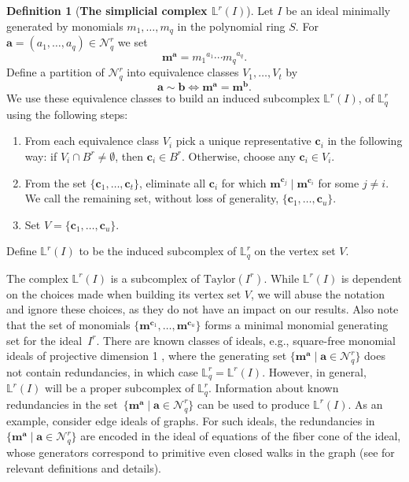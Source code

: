 \documentclass[11pt]{article}
\theoremstyle{definition}
\newtheorem{defi}[theo]{Definition}
\numberwithin{equation}{section}
\newcommand{\Nrq}{\mathcal{N}^r_q}
\newcommand{\Taylor}{\mathrm{Taylor}}
\newcommand{\m}{\mathbf{m}}
\newcommand{\Lrq}{\mathbb{L}^r_q}
\newcommand{\Lr}{\mathbb{L}^r}
\newcommand{\ba}{\mathbf{a}}
\newcommand{\bb}{\mathbf{b}}
\newcommand{\bc}{\mathbf{c}}
\newcommand{\bma}{\mathbf{m}^\ba}
\newcommand{\bmb}{\mathbf{m}^\bb}
\begin{document}
\begin{defi}[{\bf The simplicial complex $\Lr(I)$}]\label{d:LrI}
  Let $I$ be an ideal minimally generated by monomials
  $m_1,\ldots,m_q$ in the polynomial ring $S$. For $\ba = (a_1,
  \ldots, a_q) \in \Nrq$ we set
  $$\bma={m_1}^{a_1} \cdots {m_q}^{a_q}.$$ Define a partition of $\Nrq$
  into equivalence classes $V_1,\ldots,V_t$ by
  $$\ba \sim \bb \iff \bma=\bmb.$$
 We use these equivalence classes to build an induced subcomplex $\Lr(I)$, of $\Lrq$ using the following steps:
  \begin{enumerate}

  \item[Step 1.] From each equivalence class $V_i$ pick a unique
    representative $\bc_i$ in the following way: if $V_i \cap B^r \neq \emptyset$,
    then $\bc_i \in B^r$. Otherwise, choose any $\bc_i \in V_i$.
    
  \item[Step 2.]  From the set $\{\bc_1,\ldots,\bc_t\}$, eliminate all
    $\bc_i$ for which ${\m}^{\bc_j} \mid {\m}^{\bc_i}$ for some $j \neq
    i$. We call the remaining set, without loss of generality, $\{
    \bc_1,\ldots,\bc_u\}.$
  
  \item[Step 3.] Set $V=\{\bc_1,\ldots,\bc_u\}$.

  \end{enumerate}

 Define $\Lr(I)$ to be the induced subcomplex of $\Lrq$ on the
  vertex set $V$.
  \end{defi}

  The complex $\Lr(I)$ is a subcomplex of $\Taylor(I^r)$.  While
  $\Lr(I)$ is dependent on the choices made when building its vertex
  set $V$, we will abuse the notation and ignore these choices, as
  they do not have an impact on our results.  Also note that the set
  of monomials $\{ \m^{\bc _1},\ldots,\m^{\bc _u}\}$ forms a minimal
  monomial generating set for the ideal~$I^r$.  There are known
  classes of ideals, e.g., square-free monomial ideals of
  projective dimension 1 \cite[Proposition 4.1]{morse}, where
  the generating set $\{ \bma \mid \ba \in \Nrq\}$ does not contain
  redundancies, in which case $\Lrq = \Lr(I)$. However, in general,
  $\Lr(I)$ will be a proper subcomplex of $\Lrq$. Information about
  known redundancies in the set~$\{ \bma \mid \ba \in \Nrq\}$ can be used to
  produce $\Lr(I)$. As an example, consider edge ideals of graphs. For
  such ideals, the redundancies in $\{ \bma \mid \ba \in \Nrq\}$ are
  encoded in the ideal of equations of the fiber cone of the ideal,
  whose generators correspond to primitive even closed walks in the
  graph \textup{(}see \cite{villa} for relevant definitions and details\textup{)}.
\end{document}
